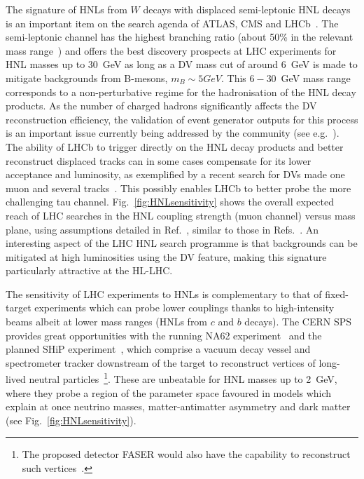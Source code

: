 The signature of HNLs from $W$ decays with displaced semi-leptonic HNL decays is an important item on the search agenda of ATLAS, CMS and LHCb~\cite{Helo2014,Izaguirre2015,Mermod2017,Antusch2017,Nemevsek:2018bbt,Cottin:2018kmq}. The semi-leptonic channel has the highest branching ratio (about 50\% in the relevant mass range~\cite{Gronau1984}) and offers the best discovery prospects at LHC experiments for HNL masses up to 30~GeV as long as a DV mass cut of around 6~GeV is made to mitigate backgrounds from B-mesons, $m_B \sim 5 GeV$. This $6-30$~GeV mass range corresponds to a non-perturbative regime for the hadronisation of the HNL decay products. As the number of charged hadrons significantly affects the DV reconstruction efficiency, the validation of event generator outputs for this process is an important issue currently being addressed by the community (see e.g.~\cite{Cottin:2018kmq}). The ability of LHCb to trigger directly on the HNL decay products and better reconstruct displaced tracks can in some cases compensate for its lower acceptance and luminosity, as exemplified by a recent search for DVs made one muon and several tracks~\cite{LHCb2017,Antusch2017}. This possibly enables LHCb to better probe the more challenging tau channel. Fig.~\ref{fig:HNLsensitivity} shows the overall expected reach of LHC searches in the HNL coupling strength (muon channel) versus mass plane, using assumptions detailed in Ref.~\cite{Mermod2017}, similar to those in Refs.~\cite{Helo2014,Izaguirre2015}. An interesting aspect of the LHC HNL search programme is that backgrounds can be mitigated at high luminosities using the DV feature, making this signature particularly attractive at the HL-LHC. 

The sensitivity of LHC experiments to HNLs is complementary to that of fixed-target experiments which can probe lower couplings thanks to high-intensity beams albeit at lower mass ranges (HNLs from $c$ and $b$ decays). The CERN SPS provides great opportunities with the running NA62 experiment~\cite{NA622017a} and the planned SHiP experiment~\cite{SHiP2015}, which comprise a vacuum decay vessel and spectrometer tracker downstream of the target to reconstruct vertices of long-lived neutral particles~\footnote{The proposed detector FASER would also have the capability to reconstruct such vertices~\cite{Feng:2017uoz}.}. These are unbeatable for HNL masses up to 2~GeV, where they probe a region of the parameter space favoured in models which explain at once neutrino masses, matter-antimatter asymmetry and dark matter~\cite{Asaka2005b,Canetti2013b,Mermod2017b} (see Fig.~\ref{fig:HNLsensitivity}).

